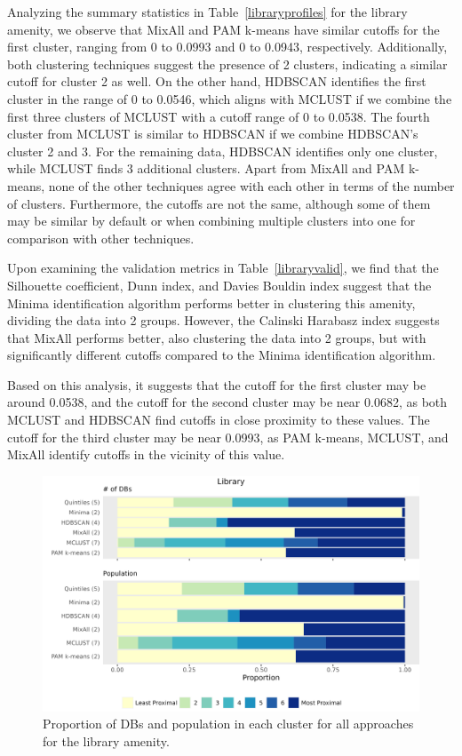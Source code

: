 \documentclass[11pt, a4paper]{article}
\begin{document}
Analyzing the summary statistics in Table~\ref{libraryprofiles} for the library amenity, we observe that MixAll and PAM k-means have similar cutoffs for the first cluster, ranging from 0 to 0.0993 and 0 to 0.0943, respectively. Additionally, both clustering techniques suggest the presence of 2 clusters, indicating a similar cutoff for cluster 2 as well. On the other hand, HDBSCAN identifies the first cluster in the range of 0 to 0.0546, which aligns with MCLUST if we combine the first three clusters of MCLUST with a cutoff range of 0 to 0.0538. The fourth cluster from MCLUST is similar to HDBSCAN if we combine HDBSCAN's cluster 2 and 3. For the remaining data, HDBSCAN identifies only one cluster, while MCLUST finds 3 additional clusters. Apart from MixAll and PAM k-means, none of the other techniques agree with each other in terms of the number of clusters. Furthermore, the cutoffs are not the same, although some of them may be similar by default or when combining multiple clusters into one for comparison with other techniques.
\par
Upon examining the validation metrics in Table~\ref{libraryvalid}, we find that the Silhouette coefficient, Dunn index, and Davies Bouldin index suggest that the Minima identification algorithm performs better in clustering this amenity, dividing the data into 2 groups. However, the Calinski Harabasz index suggests that MixAll performs better, also clustering the data into 2 groups, but with significantly different cutoffs compared to the Minima identification algorithm.
\par
Based on this analysis, it suggests that the cutoff for the first cluster may be around 0.0538, and the cutoff for the second cluster may be near 0.0682, as both MCLUST and HDBSCAN find cutoffs in close proximity to these values. The cutoff for the third cluster may be near 0.0993, as PAM k-means, MCLUST, and MixAll identify cutoffs in the vicinity of this value.



\begin{figure}[H]
\centering
\includegraphics[width=\textwidth]{./barplot_comparison/Library_barplot.png}
\caption[Library profile barplot]{Proportion of DBs and population in each cluster for all approaches for the library amenity.}\label{librarybarplot}
\end{figure}
\end{document}
